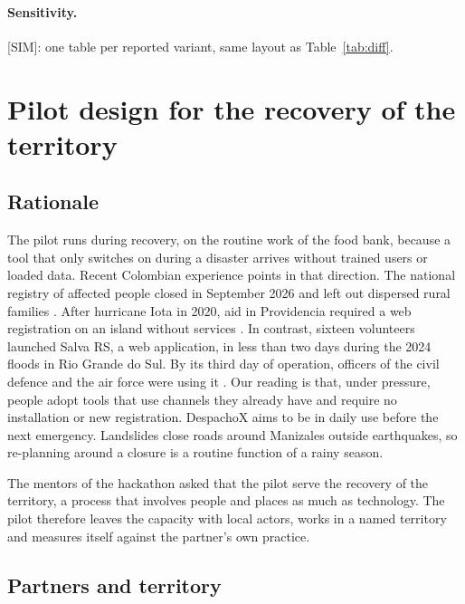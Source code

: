 \documentclass[11pt]{article}
\newcommand{\pend}[1]{\textcolor{red!60!black}{#1}}
\begin{document}
\paragraph{Sensitivity.} \pend{[SIM]: one table per reported variant, same layout as Table~\ref{tab:diff}.}

\section{Pilot design for the recovery of the territory}\label{sec:pilot}

\subsection{Rationale}

The pilot runs during recovery, on the routine work of the food bank, because a tool that only switches on during a disaster arrives without trained users or loaded data. Recent Colombian experience points in that direction. The national registry of affected people closed in September 2026 and left out dispersed rural families \citep{vanguardia2026procuraduria}. After hurricane Iota in 2020, aid in Providencia required a web registration on an island without services \citep{elcolombiano2020providencia}. In contrast, sixteen volunteers launched Salva RS, a web application, in less than two days during the 2024 floods in Rio Grande do Sul. By its third day of operation, officers of the civil defence and the air force were using it \citep{delira2024salvars}. Our reading is that, under pressure, people adopt tools that use channels they already have and require no installation or new registration. DespachoX aims to be in daily use before the next emergency. Landslides close roads around Manizales outside earthquakes, so re-planning around a closure is a routine function of a rainy season.

The mentors of the hackathon asked that the pilot serve the recovery of the territory, a process that involves people and places as much as technology. %
The pilot therefore leaves the capacity with local actors, works in a named territory and measures itself against the partner's own practice.

\subsection{Partners and territory}
\end{document}
